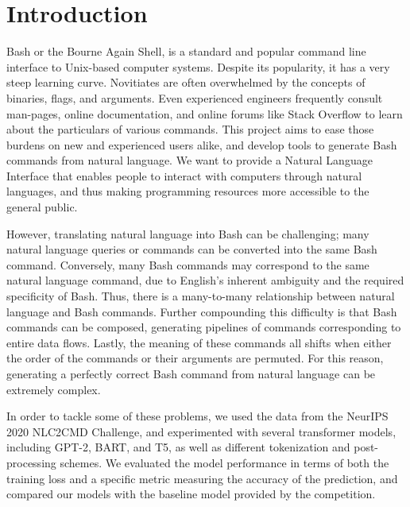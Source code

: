 \section{Introduction}
Bash or the Bourne Again Shell, is a standard and popular command line
interface to Unix-based computer systems. Despite its popularity, it has a
very steep learning curve. Novitiates are often overwhelmed by the concepts of
binaries, flags, and arguments. Even experienced engineers frequently consult
man-pages, online documentation, and online forums like Stack Overflow to learn
about the particulars of various commands. This project aims to ease those
burdens on new and experienced users alike, and develop tools to generate Bash
commands from natural language. We want to provide a Natural Language
Interface that enables people to interact with computers through natural
languages, and thus making programming resources more accessible to the
general public.
\par
However, translating natural language into Bash can be challenging; many
natural language queries or commands can be converted into the same Bash
command. Conversely, many Bash commands may correspond to the same natural
language command, due to English's inherent ambiguity and the required specificity
of Bash. Thus, there is a many-to-many relationship between natural
language and Bash commands. Further compounding this difficulty is that Bash
commands can be composed, generating pipelines of commands corresponding to
entire data flows. Lastly, the meaning of these commands all shifts when
either the order of the commands or their arguments are permuted. For this
reason, generating a perfectly correct Bash command from natural language can
be extremely complex.
\par
In order to tackle some of these problems, we used the data from the NeurIPS
2020 NLC2CMD Challenge, and experimented with several transformer models,
including GPT-2, BART, and T5, as well as different tokenization and
post-processing schemes. We evaluated the model performance in terms of both
the training loss and a specific metric measuring the accuracy of the
prediction, and compared our models with the baseline model provided by the
competition.

